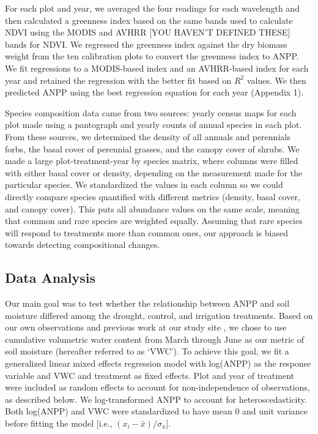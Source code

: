 \documentclass[fleqn,10pt,lineno]{wlpeerj} %
\begin{document}
For each plot and year, we averaged the four readings for each
wavelength and then calculated a greenness index based on the same bands
used to calculate NDVI using the MODIS and AVHRR {[}YOU HAVEN'T DEFINED
THESE{]} bands for NDVI. We regressed the greenness index against the
dry biomass weight from the ten calibration plots to convert the
greenness index to ANPP. We fit regressions to a MODIS-based index and
an AVHRR-based index for each year and retained the regression with the
better fit based on \(R^2\) values. We then predicted ANPP using the
best regression equation for each year (Appendix 1).

Species composition data came from two sources: yearly census maps for
each plot made using a pantograph \citep{Hill1920} and yearly counts of
annual species in each plot. From these sources, we determined the
density of all annuals and perennials forbs, the basal cover of
perennial grasses, and the canopy cover of shrubs. We made a large
plot-treatment-year by species matrix, where columns were filled with
either basal cover or density, depending on the measurement made for the
particular species. We standardized the values in each column so we
could directly compare species quantified with different metrics
(density, basal cover, and canopy cover). This puts all abundance values
on the same scale, meaning that common and rare species are weighted
equally. Assuming that rare species will respond to treatments more than
common ones, our approach is biased towards detecting compositional
changes.

\subsection{Data Analysis}\label{data-analysis}

Our main goal was to test whether the relationship between ANPP and soil
moisture differed among the drought, control, and irrigation treatments.
Based on our own observations and previous work at our study site
\citep{Blaisdell1958, Dalgleish2011, Adler2012}, we chose to use
cumulative volumetric water content from March through June as our
metric of soil moisture (hereafter referred to as `VWC'). To achieve
this goal, we fit a generalized linear mixed effects regression model
with log(ANPP) as the response variable and VWC and treatment as fixed
effects. Plot and year of treatment were included as random effects to
account for non-independence of observations, as described below. We
log-transformed ANPP to account for heteroscedasticity. Both log(ANPP)
and VWC were standardized to have mean 0 and unit variance before
fitting the model {[}i.e., \((x_i - \bar{x})/\sigma_x\){]}.
\end{document}
